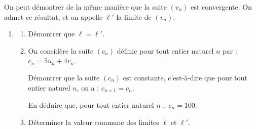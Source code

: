 \documentclass[10pt]{article}
\begin{document}
On peut démontrer de la même manière que la suite $\left(v_n\right)$ est convergente. On admet ce résultat, et on appelle $\ell'$ la limite de $\left(v_n\right)$.
\begin{enumerate}[resume]
\item 
	\begin{enumerate}
		\item Démontrer que $\ell = \ell'$.
		\item On considère la suite $\left(c_n\right)$ définie pour tout entier naturel $n$ par : $c_n = 5u_n + 4v_n$.
		
Démontrer que la suite $\left(c_n\right)$ est constante, c'est-à-dire que pour tout entier naturel $n$, on a : $c_{n+1} = c_n$. 

En déduire que, pour tout entier naturel $n$ ,\, $c_n = 100$.
		\item Déterminer la valeur commune des limites  $\ell$ et $\ell'$.
	\end{enumerate}
\end{enumerate}

\bigskip
\end{document}

